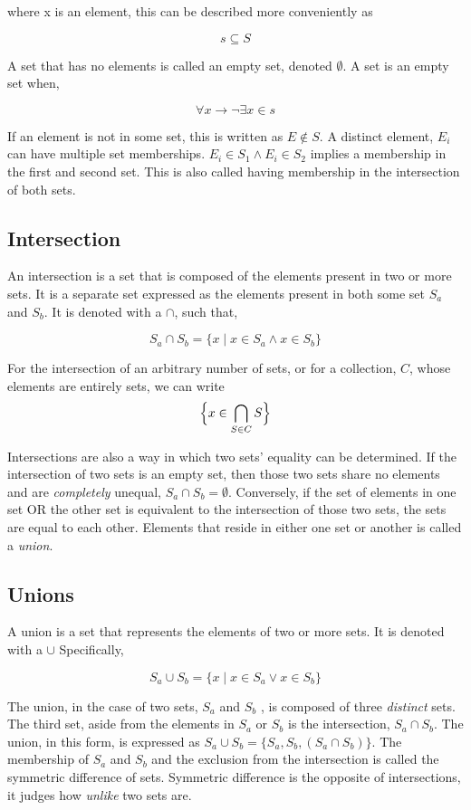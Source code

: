 where x is an element, this can be described more conveniently as

$$
s \subseteq S
$$

A set that has no elements is called an empty set, denoted $\emptyset$. A set is an empty set when,

$$
\forall x \rightarrow \neg \exists x \in s
$$


If an element is not in some set, this is written as $E \notin S$. A distinct element, $E_i$ can have multiple set memberships. $E_i \in S_1 \land E_i \in S_2$ implies a membership in the first and second set. This is also called having membership in the intersection of both sets.

\subsection{Intersection}

An intersection is a set that is composed of the elements present in two or more sets. It is a separate set expressed as the elements present in both some set $S_a$ and $S_b$. It is denoted with a $\cap$, such that,

$$
S_a \cap S_b = \{x \mid x \in S_a \land x \in S_b\}
$$

For the intersection of an arbitrary number of sets, or for a collection, $C$, whose elements are entirely sets, we can write
$$
\Bigl\{ x \in \bigcap\limits_{S \in C} S \Bigr\}
$$

Intersections are also a way in which two sets' equality can be determined. If the intersection of two sets is an empty set, then those two sets share no elements and are \textit{completely} unequal, $S_a \cap S_b = \emptyset$. Conversely, if the set of elements in one set OR the other set is equivalent to the intersection of those two sets, the sets are equal to each other. Elements that reside in either one set or another is called a \textit{union}.

\subsection{Unions}

A union is a set that represents the elements of two or more sets. It is denoted with a $\cup$ Specifically,

$$
S_a \cup S_b = \{ x \mid x \in S_a \lor x \in S_b\}
$$ 

The union, in the case of two sets, $S_a$ and $S_b$ ,  is composed of three \textit{distinct} sets. The third set, aside from the elements in $S_a$ or $S_b$ is the intersection, $S_a \cap S_b$. The union, in this form, is expressed as $S_a \cup S_b = \{S_a, S_b, (S_a \cap S_b)\}$. The membership of $S_a$ and $S_b$ and the exclusion from the intersection is called the symmetric difference of sets. Symmetric difference is the opposite of intersections, it judges how \textit{unlike} two sets are.


